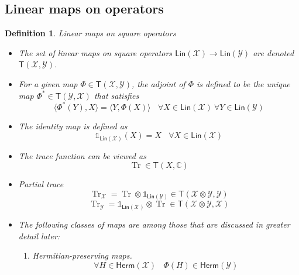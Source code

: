 \documentclass[aps,pra,onecolumn,notitlepage,superscriptaddress]{revtex4-1}
\newcommand{\C}{\mathbb{C}}
\newcommand{\spc}[1]{\mathcal{#1}}
\newcommand{\Lin}{\mathsf{Lin}}
\newcommand{\Herm}{\mathsf{Herm}}
\newcommand{\T}{\mathsf{T}}
\def\>{\rangle}
\def\<{\langle}
\newcommand{\Tr}{\operatorname{Tr}}
\newcommand\I{\mathds{1}}
\newtheorem{defi}{Definition}
\begin{document}
    \subsection{Linear maps on operators}
    \begin{defi}
        Linear maps on square operators
        \begin{itemize}
            \item The set of linear maps on square operators $\Lin(\spc X) \to \Lin(\spc Y)$ are denoted $\T(\spc X,\spc Y)$.
            \item For a given map $\Phi \in \T(\spc X,\spc Y)$, the adjoint of $\Phi$ is defined to be the unique map $\Phi^* \in \T(\spc Y,\spc X)$ that satisfies
            \begin{equation}
                \< \Phi^*(Y), X \> = \< Y, \Phi(X) \> \ \ \ \ \forall X \in \Lin(\spc X) \ \forall Y \in \Lin(\spc Y)
            \end{equation}
            \item The identity map is defined as
            \begin{equation}
                \I_{\Lin(\spc X)}(X) = X \ \ \ \ \forall X \in \Lin(\spc X)
            \end{equation}
            \item The trace function can be viewed as
            \begin{equation}
                \Tr \in \T(X,\C)
            \end{equation}
            \item Partial trace
            \begin{equation}
                \Tr_{\spc X} = \Tr \otimes \I_{\Lin(\spc Y)} \in \T(\spc X \otimes \spc Y, \spc Y)
            \end{equation}
            \begin{equation}
                \Tr_{\spc Y} = \I_{\Lin(\spc X)} \otimes \Tr \in \T(\spc X \otimes \spc Y, \spc X)
            \end{equation}
            \item The following classes of maps are among those that are discussed in greater detail later:
            \begin{enumerate}
                \item Hermitian-preserving maps. 
                    \begin{equation*}
                        \forall H \in \Herm(\spc X) \ \ \ \ \Phi(H) \in \Herm(\spc Y)
                    \end{equation*}

\end{enumerate}
\end{itemize}
\end{defi}
\end{document}
